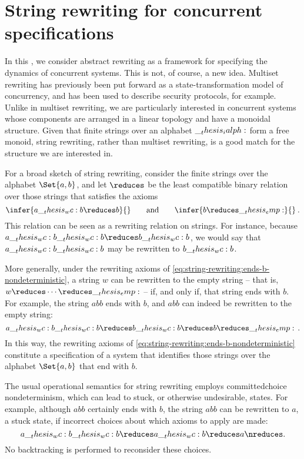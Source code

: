 \chapter{String rewriting for concurrent specifications}\label{ch:string-rewriting}

In this , we consider abstract rewriting as a framework for specifying the dynamics of concurrent systems.
This is not, of course, a new idea.
Multiset rewriting\autocites{Cervesato+Scedrov:IC09}{Meseguer:TCS92} has previously been put forward as a state-transformation model of concurrency, and has been used to describe security protocols\autocites{Cervesato+:CSFW99}{Durgin+:JCS04}, for example.
Unlike in multiset rewriting, we are particularly interested in concurrent systems whose components are arranged in a linear topology and have a monoidal structure.
Given that finite strings over an alphabet $\__thesis_ialph:$ form a free monoid, string rewriting, rather than multiset rewriting, is a good match for the structure we are interested in.

For a broad sketch of string rewriting, consider the finite strings over the alphabet $\Set{a,b}$, and let $\reduces$ be the least compatible binary relation over those strings that satisfies the axioms
\begin{equation}\label{eq:string-rewriting:ends-b-nondeterministic}
  \infer{a \wc b \reduces b}{}
  \qquad\text{and}\qquad
  \infer{b \reduces \emp}{}
  \:.
\end{equation}
This relation can be seen as a rewriting relation on strings.
For instance, because $a \wc b \wc b \reduces b \wc b$, we would say that $a \wc b \wc b$ may be rewritten to $b \wc b$.

More generally, under the rewriting axioms of \cref{eq:string-rewriting:ends-b-nondeterministic}, a string $w$ can be rewritten to the empty string -- that is, $w \reduces \dotsb \reduces \emp$ -- if, and only if, that string ends with $b$.
For example, the string $abb$ ends with $b$, and $abb$ can indeed be rewritten to the empty string:
\begin{equation*}
  a \wc b \wc b
    \reduces b \wc b
    \reduces b
    \reduces \emp
  \,.
\end{equation*}
In this way, the rewriting axioms of \cref{eq:string-rewriting:ends-b-nondeterministic} constitute a specification of a system that identifies those strings over the alphabet $\Set{a,b}$ that end with $b$.

The usual operational semantics for string rewriting employs committed\-choice nondeterminism, which
can lead to stuck, or otherwise undesirable, states.
For example, although $abb$ certainly ends with $b$, the string $abb$ can be rewritten to $a$, a stuck state, if incorrect choices about which axioms to apply are made:
\begin{equation*}
  a \wc b \wc b \reduces a \wc b \reduces a \nreduces
  \,\!.
\end{equation*}
No backtracking is performed to reconsider these choices.

